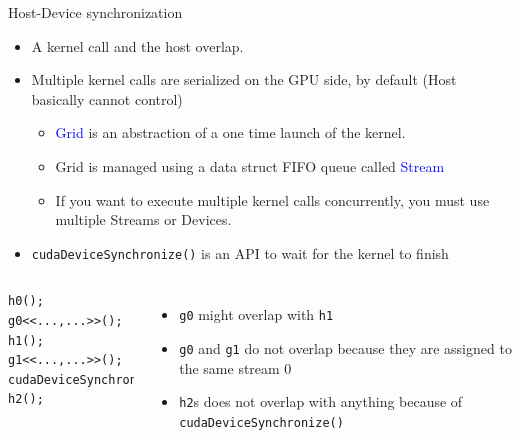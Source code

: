 \documentclass[dvipdfmx, 11pt, aspectratio=169]{beamer}   %
\begin{document}
\begin{frame}[fragile]{Host-Device synchronization}
  \begin{itemize}
    \item A kernel call and the host overlap.
    \item Multiple kernel calls are serialized on the GPU side, by default (Host basically cannot control)
    \begin{itemize}
      \item \textcolor{blue}{Grid} is an abstraction of a one time launch of the kernel.
      \item Grid is managed using a data struct FIFO queue called \textcolor{blue}{Stream}
      \item If you want to execute multiple kernel calls concurrently, you must use multiple Streams or Devices.
    \end{itemize}
    \item \lstinline|cudaDeviceSynchronize()| is an API to wait for the kernel to finish
  \end{itemize}
  \begin{columns}
    \begin{lstlisting}[language=CUDA]
h0();
g0<<...,...>>();
h1();
g1<<...,...>>();
cudaDeviceSynchronize();
h2();
\end{lstlisting}
    \begin{itemize}
      \item \lstinline|g0| might overlap with \lstinline|h1|
      \item \lstinline|g0| and \lstinline|g1| do not overlap because they are assigned to the same stream 0
      \item \lstinline|h2|s does not overlap with anything because of \lstinline|cudaDeviceSynchronize()|
    \end{itemize}
  \end{columns}
\end{frame}
\end{document}
